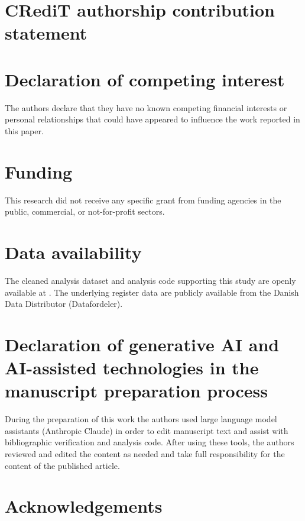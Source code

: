 
\section*{CRediT authorship contribution statement}

\section*{Declaration of competing interest}
The authors declare that they have no known competing financial interests
or personal relationships that could have appeared to influence the work
reported in this paper.

\section*{Funding}
This research did not receive any specific grant from funding agencies in
the public, commercial, or not-for-profit sectors.

\section*{Data availability}\label{sec:data-availability}
The cleaned analysis dataset and analysis code supporting this study are
openly available at . The
underlying register data are publicly available from the Danish Data
Distributor (Datafordeler).

\section*{Declaration of generative AI and AI-assisted technologies in the manuscript preparation process}
During the preparation of this work the authors used large language model
assistants (Anthropic Claude) in order to edit manuscript text and assist
with bibliographic verification and analysis code. After using these
tools, the authors reviewed and edited the content as needed and take
full responsibility for the content of the published article.

\section*{Acknowledgements}
